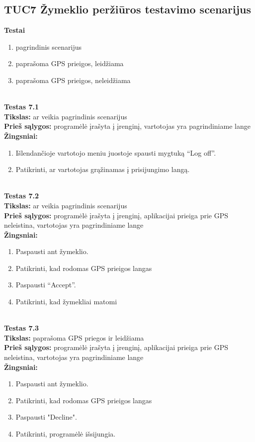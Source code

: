 \documentclass{VUMIFPSkursinis}
\begin{document}
	\subsection{TUC7 Žymeklio peržiūros testavimo scenarijus}
		\textbf{Testai}
		\begin{enumerate}[noitemsep,topsep=0pt]
			\item pagrindinis scenarijus
			\item paprašoma GPS prieigos, leidžiama
			\item paprašoma GPS prieigos, neleidžiama
		\end{enumerate}
		\textbf{}\\
		\textbf{Testas 7.1}\\
		\textbf{Tikslas:} ar veikia pagrindinis scenarijus\\
		\textbf{Prieš sąlygos:} programėlė įrašyta į įrenginį, vartotojas yra pagrindiniame lange\\
		\textbf{Žingsniai:}
		\begin{enumerate}[noitemsep,topsep=0pt]
			\item Išlendančioje vartotojo meniu juostoje spausti mygtuką “Log off”.
			\item Patikrinti, ar vartotojas grąžinamas į prisijungimo langą.
		\end{enumerate}
		\textbf{}\\
		\textbf{Testas 7.2}\\
		\textbf{Tikslas:} ar veikia pagrindinis scenarijus\\
		\textbf{Prieš sąlygos:} programėlė įrašyta į įrenginį, aplikacijai prieiga prie GPS neleistina, vartotojas yra pagrindiniame lange\\
		\textbf{Žingsniai:}
		\begin{enumerate}[noitemsep,topsep=0pt]
			\item Paspausti ant žymeklio.
			\item Patikrinti, kad rodomas GPS prieigos langas
			\item Paspausti “Accept”.
			\item Patikrinti, kad žymekliai matomi
		\end{enumerate}
		\textbf{}\\
		\textbf{Testas 7.3}\\
		\textbf{Tikslas:} paprašoma GPS priegos ir leidžiama\\
		\textbf{Prieš sąlygos:} programėlė įrašyta į įrenginį, aplikacijai prieiga prie GPS neleistina, vartotojas yra pagrindiniame lange\\
		\textbf{Žingsniai:}
		\begin{enumerate}[noitemsep,topsep=0pt]
			\item Paspausti ant žymeklio.
			\item Patikrinti, kad rodomas GPS prieigos langas
			\item Paspausti "Decline".
			\item Patikrinti, programėlė išsijungia.
		\end{enumerate}
\end{document}
